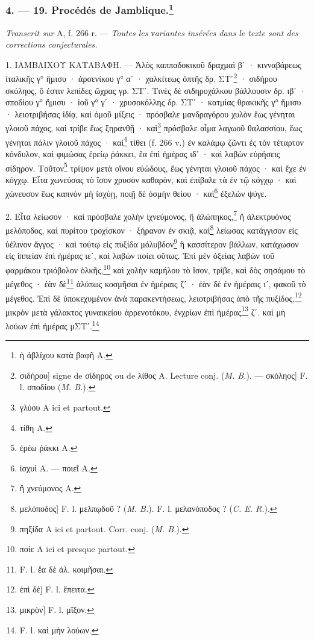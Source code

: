 \documentclass[a4paper, 11pt, oneside, polutonikogreek, french]{article}
\begin{document}
\bigskip
\centerline{\EightStarTaper}
\centerline{\EightStarTaper\EightStarTaper}
\bigskip

\subsubsection[4. --- 19. Procédés de Jamblique.]{4. --- 19. Procédés de Jamblique.\footnote{ἡ ἁβλίχου κατὰ βαφῆ A.}}

\emph{Transcrit sur} A, f. 266 r. --- \emph{Toutes les νariantes insérées dans le texte sont des corrections conjecturales.}

\bigskip

1. ΙΑΜΒΛΙΧΟΥ ΚΑΤΑΒΑΦΗ. --- Ἁλὸς καππαδοκικοῦ δραχμαὶ βʹ · κινναβάρεως ἰταλικῆς γ° ἥμισυ · ἀρσενίκου γ° αʹ · χαλκίτεως ὀπτῆς δρ. ΣΤʹ\footnote{σιδήρου] signe de σίδηρος ou de λίθος A. Lecture conj. (\emph{M. B.}). --- σκόληος] F. l. σποδίου (\emph{M. B.}).} · σιδήρου σκόληος, ὅ ἐστιν λεπίδες ὤχρας γρ. ΣΤʹ. Τινὲς δὲ σιδηροχάλκου βάλλουσιν δρ. ιβʹ · σποδίου γ° ἥμισυ · ἰοῦ γ° γʹ · χρυσοκόλλης δρ. ΣΤʹ · κατμίας θρακικῆς γ° ἥμισυ · λειοτριβήσας ἰδίᾳ, καὶ ὁμοῦ μίξεις · πρόσβαλε μανδραγόρου χυλὸν ἕως γένηται γλοιοῦ πάχος, καὶ τρίβε ἕως ξηρανθῇ · καὶ\footnote{γλύου A ici et partout.} πρόσβαλε αἷμα λαγωοῦ θαλασσίου, ἕως γένηται πάλιν γλοιοῦ πάχος · καὶ\footnote{τίθη A.} τίθει (f. 266 v.) ἐν καλάμῳ ζῶντι ἐς τὸν τέταρτον κόνδυλον, καὶ φιμώσας ἑρείῳ ῥάκκει, ἔα ἐπὶ ἡμέρας ιδʹ · καὶ λαβὼν εὑρήσεις σίδηρον. Τοῦτον\footnote{ἐρέω ῥάκκι A.} τρίψον μετὰ οἴνου εὐώδους, ἕως γένηται γλοιοῦ πάχος · καὶ ἔχε ἐν κόγχῳ. Εἶτα χωνεύσας τὸ ἴσον χρυσὸν καθαρὸν, καὶ ἐπίβαλε τὰ ἐν τῷ κόγχῳ · καὶ χώνευσον ἕως καπνὸν μὴ ἰσχύῃ, ποιῇ δὲ ὀσμὴν θείου · καὶ\footnote{ἰσχυὶ A. --- ποιεῖ A.} ἐξελὼν ψύγε.

2. Εἶτα λείωσον · καὶ πρόσβαλε χολὴν ἰχνεύμονος, ἢ ἀλώπηκος,\footnote{ἢ χνεύμονος A.} ἢ ἀλεκτρυόνος μελόποδος, καὶ πυρίτου τροχίσκον · ξήρανον ἐν σκιᾷ, καὶ\footnote{μελόποδος] F. l. μελπῳδοῦ ? (\emph{M. B.}). F. l. μελανόποδος ? (\emph{C. E. R.}).} λείωσας κατάγγισον εἰς ὑέλινον ἄγγος · καὶ τούτῳ εἰς πυξίδα μόλυβδον\footnote{πηξίδα A ici et partout. Corr. conj. (\emph{M. B.}).} ἢ κασσίτερον βάλλων, κατάχωσον εἰς ἱππείαν ἐπὶ ἡμέρας ιεʹ, καὶ λαβὼν ποίει οὕτως. Ἐπὶ μὲν ὀξείας λαβὼν τοῦ φαρμάκου τριόβολον ὁλκῆς,\footnote{ποίε A ici et presque partout.} καὶ χολὴν καμήλου τὸ ἴσον, τρίβε, καὶ δὸς σησάμου τὸ μέγεθος · ἐὰν δὲ\footnote{F. l. ἔα δὲ ἀλ. κοιμῆσαι.} ἀλύπως κοσμῆσαι ἐν ἡμέραις ζʹ · ἐὰν δὲ ἐν ἡμέραις ιʹ, φακοῦ τὸ μέγεθος. Ἐπὶ δὲ ὑποκεχυμένον ἀνὰ παρακεντήσεως, λειοτριβήσας ἀπὸ τῆς πυξίδος,\footnote{ἐπὶ δὲ] F. l. ἔπειτα.} μικρὸν μετὰ γάλακτος γυναικείου ἀρρενοτόκου, ἐνχρίων ἐπὶ ἡμέρας\footnote{μικρὸν] F. l. μῖξον.} ζʹ. καὶ μὴ λούων ἐπὶ ἠμέρας μΣΤʹ.\footnote{F. l. καὶ μὴν λούων.}
\end{document}
